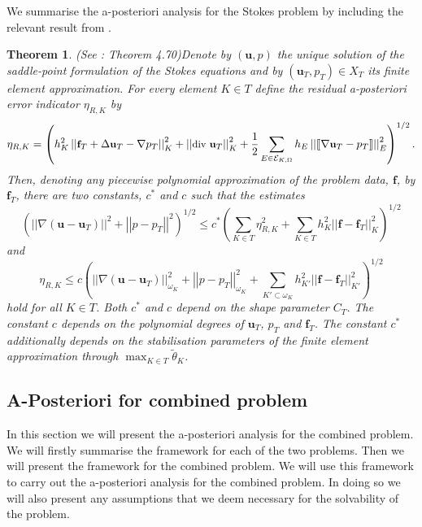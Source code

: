 \documentclass[12pt,a4paper]{article}
\newtheorem{theorem}{Theorem}[section]
\theoremstyle{definition}
\begin{document}
We summarise the a-posteriori analysis for the Stokes problem by including the relevant result from \cite{verfurth2013posteriori}.
\begin{theorem}{(See \cite[\S4.10.3]{verfurth2013posteriori}: Theorem 4.70)}\label{verf_theorem_apost_err_ind}
Denote by $\left(\textbf{u},p\right)$ the unique solution of the saddle-point formulation of the Stokes equations and by $\left(\textbf{u}_T,p_T\right)\in X_T$ its finite element approximation.  For every element $K\in T$ define the residual a-posteriori error indicator $\eta_{R,K}$ by
\begin{equation}\small\label{a_posteriori_ind_stokes}
\eta_{R,K}=\left(h^2_K\left|\left|\textbf{f}_T+\Delta \textbf{u}_T-\nabla p_T\right|\right|^2_K+\left|\left|\text{div } \textbf{u}_T\right|\right|^2_K+\frac{1}{2}\sum_{E\in\mathcal{E}_{K,\Omega}}h_E\left|\left| \llbracket \nabla \textbf{u}_T -p_T \rrbracket \right|\right|_E^2\right)^{1/2}.\nonumber
\end{equation}
Then, denoting any piecewise polynomial approximation of the problem data, $\textbf{f}$, by $\textbf{f}_T$, there are two constants, $c^*$ and $c$ such that the estimates
\begin{equation}\nonumber
\left(\left|\left|\nabla\left(\textbf{u}-\textbf{u}_T\right)\right|\right|^2+\left|\left|p-p_T\right|\right|^2\right)^{1/2}\leq c^*\left(\sum_{K\in T}\eta^2_{R,K}+\sum_{K\in T}h^2_K\left|\left|\textbf{f}-\textbf{f}_T\right|\right|^2_K\right)^{1/2}
\end{equation}
and
\begin{equation}\nonumber
\eta_{R,K}\leq c \left(\left|\left|\nabla\left(\textbf{u}-\textbf{u}_T\right)\right|\right|_{\omega_K}^2+\left|\left|p-p_T\right|\right|_{\omega_K}^2+\sum_{K'\subset \omega_K}h^2_{K'}\left|\left|\textbf{f}-\textbf{f}_T\right|\right|^2_{K'}\right)^{1/2}
\end{equation}
hold for all $K\in T$.  Both $c^*$ and $c$ depend on the shape parameter $C_T$.  The constant $c$ depends on the polynomial degrees of $\textbf{u}_T$, $p_T$ and $\textbf{f}_T$.  The constant $c^*$ additionally depends on the stabilisation parameters of the finite element approximation through $\max_{K\in T}\widetilde{\theta}_K$.
\end{theorem}


\subsection{A-Posteriori for combined problem}
In this section we will present the a-posteriori analysis for the combined problem.  We will firstly summarise the framework for each of the two problems.  Then we will present the framework for the combined problem.   We will use this framework to carry out the a-posteriori analysis for the combined problem.  In doing so we will also present any assumptions that we deem necessary for the solvability of the problem.
\end{document}
